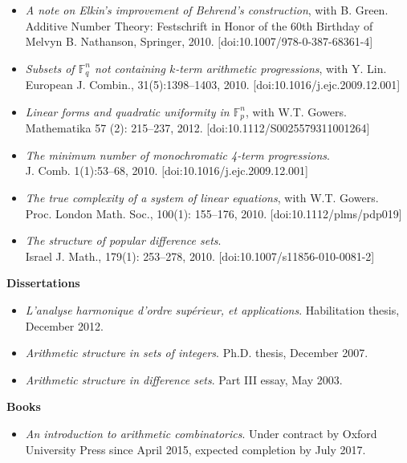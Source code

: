 \documentclass[11pt]{article}
\newenvironment{mitemize}{
\begin{itemize}
  \setlength{\itemsep}{1pt}
  \setlength{\parskip}{0pt}
  \setlength{\parsep}{0pt}
}{\end{itemize}}
\def\F{\mathbb{F}}
\begin{document}
\begin{mitemize}
\item \textit{A note on Elkin's improvement of Behrend's construction}, with B. Green. 
\\Additive Number Theory: Festschrift in Honor of the 60th Birthday of Melvyn B. Nathanson, Springer, 2010. $[$doi:10.1007/978-0-387-68361-4]
\item \textit{Subsets of $\F_{q}^{n}$ not containing $k$-term arithmetic progressions}, with Y. Lin.
\\European J. Combin., 31(5):1398--1403, 2010. [doi:10.1016/j.ejc.2009.12.001]
\item \textit{Linear forms and quadratic uniformity in $\F_{p}^{n}$}, with W.T. Gowers. 
\\Mathematika 57 (2): 215--237, 2012. [doi:10.1112/S0025579311001264]
\item \textit{The minimum number of monochromatic 4-term progressions}. 
\\J. Comb. 1(1):53--68, 2010. $[$doi:10.1016/j.ejc.2009.12.001]
\item \textit{The true complexity of a system of linear equations}, with W.T. Gowers. 
\\Proc. London Math. Soc., 100(1): 155--176, 2010. [doi:10.1112/plms/pdp019] 
\item \textit{The structure of popular difference sets}. 
\\Israel J. Math., 179(1): 253--278, 2010. $[$doi:10.1007/s11856-010-0081-2]
\end{mitemize}

\vspace{3pt}
\textbf{Dissertations}
\begin{mitemize}
\item \textit{L'analyse harmonique d'ordre sup\'erieur, et applications}. Habilitation thesis, December 2012.
\item \textit{Arithmetic structure in sets of integers}. Ph.D. thesis, December 2007. 
\item \textit{Arithmetic structure in difference sets}. Part III essay, May 2003.
\end{mitemize}

\vspace{3pt}
\textbf{Books}
\begin{mitemize}
\item \textit{An introduction to arithmetic combinatorics}. Under contract by Oxford University Press since April 2015, expected completion by July 2017.
\end{mitemize}
\end{document}
